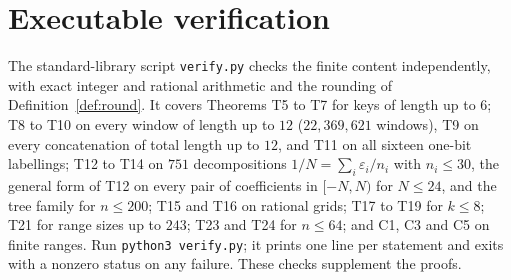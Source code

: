 \documentclass[11pt,a4paper]{article}
\theoremstyle{definition}
\begin{document}
\section{Executable verification}
The standard-library script \texttt{verify.py} checks the finite content independently, with exact integer and rational arithmetic and the rounding of Definition~\ref{def:round}. It covers Theorems T5 to T7 for keys of length up to $6$; T8 to T10 on every window of length up to $12$ ($22{,}369{,}621$ windows), T9 on every concatenation of total length up to $12$, and T11 on all sixteen one-bit labellings; T12 to T14 on $751$ decompositions $1/N=\sum_i\varepsilon_i/n_i$ with $n_i\le30$, the general form of T12 on every pair of coefficients in $[-N,N)$ for $N\le24$, and the tree family for $n\le200$; T15 and T16 on rational grids; T17 to T19 for $k\le8$; T21 for range sizes up to $243$; T23 and T24 for $n\le64$; and C1, C3 and C5 on finite ranges. Run \texttt{python3 verify.py}; it prints one line per statement and exits with a nonzero status on any failure. These checks supplement the proofs.
\end{document}
